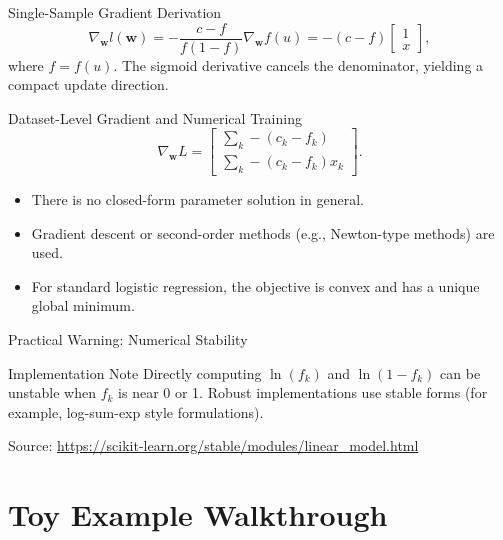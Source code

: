 \documentclass[10pt]{beamer}
\begin{document}
\begin{frame}{Single-Sample Gradient Derivation}
  \justifying
  \begin{equation*}
    \nabla_{\bm{w}} l(\bm{w})
    = -\frac{c-f}{f(1-f)}\nabla_{\bm{w}}f(u)
    = -(c-f)
    \begin{bmatrix}1\\x
    \end{bmatrix},
  \end{equation*}
  where $f=f(u)$. The sigmoid derivative cancels the denominator, yielding a compact update direction.
\end{frame}

\begin{frame}{Dataset-Level Gradient and Numerical Training}
  \justifying
  \begin{equation*}
    \nabla_{\bm{w}}L=
    \begin{bmatrix}
      \sum_k -(c_k-f_k)\\
      \sum_k -(c_k-f_k)x_k
    \end{bmatrix}.
  \end{equation*}
  \begin{itemize}
    \item There is no closed-form parameter solution in general.
    \item Gradient descent or second-order methods (e.g., Newton-type methods) are used.
    \item For standard logistic regression, the objective is convex and has a unique global minimum.
  \end{itemize}
\end{frame}

\begin{frame}{Practical Warning: Numerical Stability}
  \justifying
  \begin{warningbox}{Implementation Note}
    Directly computing $\ln(f_k)$ and $\ln(1-f_k)$ can be unstable when $f_k$ is near 0 or 1.
    Robust implementations use stable forms (for example, log-sum-exp style formulations).
  \end{warningbox}
  \vspace{0.5em}
  {\footnotesize Source: \url{https://scikit-learn.org/stable/modules/linear_model.html}}
\end{frame}

\section{Toy Example Walkthrough}
\end{document}
